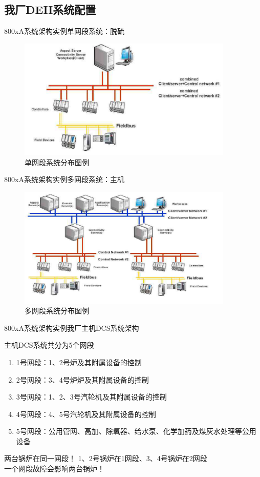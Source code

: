 \documentclass[12pt,hyperref={CJKbookmarks=true}]{beamer} %
\begin{document}
\subsection{我厂DEH系统配置}
\begin{frame}{800xA系统架构实例}{单网段系统：脱硫}
		\begin{figure}[htbp]
 \centering
\includegraphics[width=290pt,keepaspectratio]{dan.png}
\caption{单网段系统分布图例}
\label{fig:myphoto}
\end{figure}
	\end{frame}
\begin{frame}{800xA系统架构实例}{多网段系统：主机}
		\begin{figure}[htbp]
 \centering
\includegraphics[width=290pt,keepaspectratio]{da.png}
\caption{多网段系统分布图例}
\label{fig:myphoto}
\end{figure}
	\end{frame}
\begin{frame}{800xA系统架构实例}{我厂主机DCS系统架构}
		\begin{block}{主机DCS系统共分为5个网段}
			\begin{enumerate}
				\item  1号网段：1、2号炉及其附属设备的控制
				
				\item  2号网段：3、4号炉炉及其附属设备的控制
				
				\item   3号网段：1、2、3号汽轮机及其附属设备的控制
				
				\item  4号网段：4、5号汽轮机及其附属设备的控制
\item   5号网段：公用管网、高加、除氧器、给水泵、化学加药及煤灰水处理等公用设备
			\end{enumerate}
		\end{block}
\begin{alertblock}{\heiti 两台锅炉在同一网段！}
			1、2号锅炉在1网段、3、4号锅炉在2网段\\  一个网段故障会影响两台锅炉！
		\end{alertblock}
	\end{frame}
\end{document}
